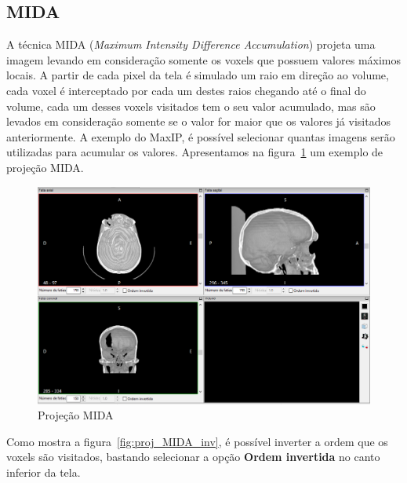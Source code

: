 \subsection{MIDA}
\label{sub:mida}
A técnica MIDA (\textit{Maximum Intensity Difference Accumulation}) projeta uma imagem levando em consideração somente os voxels que possuem valores máximos locais. A partir de cada pixel da tela é simulado um raio em direção ao volume, cada voxel é interceptado por cada um destes raios chegando até o final do volume, cada um desses voxels visitados tem o seu valor acumulado, mas são levados em consideração somente se o valor for maior que os valores já visitados anteriormente. A exemplo do MaxIP, é possível selecionar quantas imagens serão utilizadas para acumular os valores. Apresentamos na figura~\ref{fig:proj_MIDA} um exemplo de projeção MIDA.  

\begin{figure}[H]
\centering
\includegraphics[scale=0.40]{../user_guide_figures/invesalius_screen/multiplanar_window_mida_pt.png}
\caption{Projeção MIDA}
\label{fig:proj_MIDA}
\end{figure}

Como mostra a figura~\ref{fig:proj_MIDA_inv}, é possível inverter a ordem que os voxels são visitados, bastando selecionar a opção \textbf{Ordem invertida} no canto inferior da tela.

